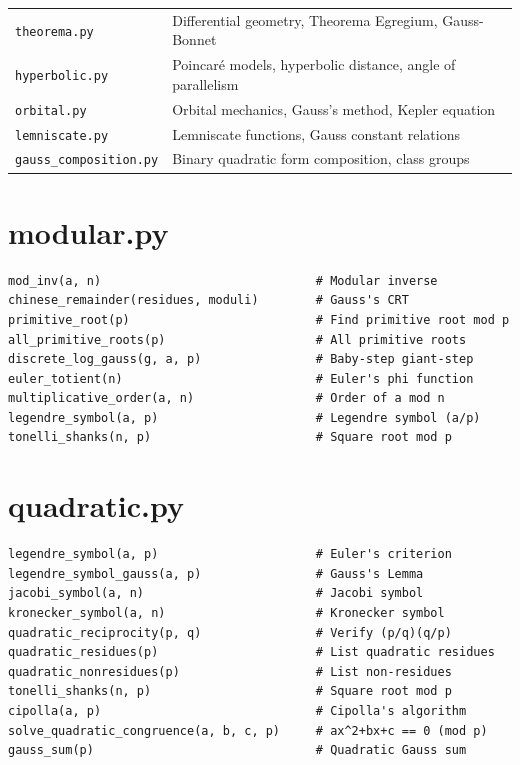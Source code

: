 \begin{table}[H]
\begin{tabular}{ll}
\texttt{theorema.py} & Differential geometry, Theorema Egregium, Gauss-Bonnet \\
\texttt{hyperbolic.py} & Poincar\'e models, hyperbolic distance, angle of parallelism \\
\texttt{orbital.py} & Orbital mechanics, Gauss's method, Kepler equation \\
\texttt{lemniscate.py} & Lemniscate functions, Gauss constant relations \\
\texttt{gauss\_composition.py} & Binary quadratic form composition, class groups \\
\bottomrule
\end{tabular}
\end{table}

\section{modular.py}

\begin{lstlisting}[style=python]
mod_inv(a, n)                              # Modular inverse
chinese_remainder(residues, moduli)        # Gauss's CRT
primitive_root(p)                          # Find primitive root mod p
all_primitive_roots(p)                     # All primitive roots
discrete_log_gauss(g, a, p)                # Baby-step giant-step
euler_totient(n)                           # Euler's phi function
multiplicative_order(a, n)                 # Order of a mod n
legendre_symbol(a, p)                      # Legendre symbol (a/p)
tonelli_shanks(n, p)                       # Square root mod p
\end{lstlisting}

\section{quadratic.py}

\begin{lstlisting}[style=python]
legendre_symbol(a, p)                      # Euler's criterion
legendre_symbol_gauss(a, p)                # Gauss's Lemma
jacobi_symbol(a, n)                        # Jacobi symbol
kronecker_symbol(a, n)                     # Kronecker symbol
quadratic_reciprocity(p, q)                # Verify (p/q)(q/p)
quadratic_residues(p)                      # List quadratic residues
quadratic_nonresidues(p)                   # List non-residues
tonelli_shanks(n, p)                       # Square root mod p
cipolla(a, p)                              # Cipolla's algorithm
solve_quadratic_congruence(a, b, c, p)     # ax^2+bx+c == 0 (mod p)
gauss_sum(p)                               # Quadratic Gauss sum
\end{lstlisting}

